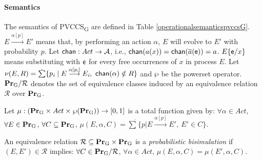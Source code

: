 \documentclass[10pt, conference, compsocconf]{IEEEtran}
\begin{document}
\paragraph{Semantics}
The semantics of PVCCS\textsubscript{G} are defined in Table \ref{operationalsemanticspvccsG}. $E\stackrel{\alpha[p]}{\rightarrow}E'$ means that, by performing an action $\alpha$, $E$ will evolve to $E'$ with probability $p$.
Let ${\sf chan}:Act\rightarrow \mathcal{A}$, i.e., ${\sf chan}(a(x))={\sf chan}(\overline{a}({\sf e}))=a$. $E\{{\sf e}/x\}$ means substituting with ${\sf e}$ for every free occurrences of $x$ in process $E$.
Let $\nu(E,R)=\dot{\sum}\{p_{\textit{i}}\mid E\stackrel{\alpha[p_{\textit{i}}]}{\longrightarrow}E_{\textit{i}}, ~{\sf chan}(\alpha)\notin R\}$ and $\wp$ be the powerset operator.
$\mathbf{Pr\textsubscript{G}}/\mathcal{R}$ denotes the set of equivalence classes induced by an equivalence relation $\mathcal{R}$ over $\mathbf{Pr\textsubscript{G}}$.
\begin{definition}
Let $\mu:(\mathbf{Pr\textsubscript{\rm G}}\times Act\times \wp(\mathbf{Pr\textsubscript{\rm G}}))\rightarrow[0,1]$ is a total function given by: $\forall \alpha\in Act$, $\forall E\in \mathbf{Pr\textsubscript{\rm G}}$, $\forall C\subseteq \mathbf{Pr\textsubscript{\rm G}}$, $\mu(E,\alpha,C)=\dot{\sum}\{p|E\stackrel{\alpha[p]}{\longrightarrow}E',~E'\in C\}$. \end{definition}

\begin{definition}
An equivalence relation $\mathcal{R}\subseteq \mathbf{Pr}\textsubscript{\rm G} \times \mathbf{Pr}\textsubscript{\rm G}$ is a \textit{probabilistic bisimulation} if $(E, E')\in \mathcal{R}$ implies: $\forall C\in \mathbf{Pr}\textsubscript{\rm G}/\mathcal{R}$, $\forall\alpha\in Act$, $\mu(E, \alpha, C)=\mu(E', \alpha, C)$.
\end{definition}
\end{document}
